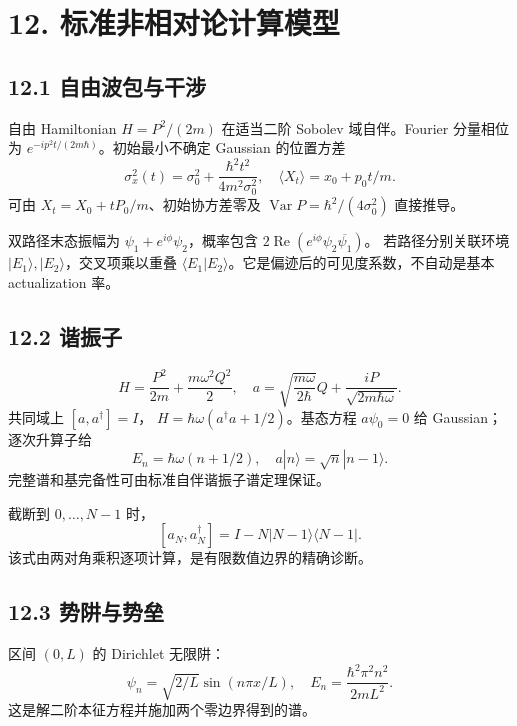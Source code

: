 \documentclass[
  11pt,
  oneside]{book}
\begin{document}
\hypertarget{ch-12}{%
\chapter{12. 标准非相对论计算模型}\label{ch-12}}

\hypertarget{ux81eaux7531ux6ce2ux5305ux4e0eux5e72ux6d89}{%
\section{12.1
自由波包与干涉}\label{ux81eaux7531ux6ce2ux5305ux4e0eux5e72ux6d89}}

自由 Hamiltonian \(H=P^2/(2m)\) 在适当二阶 Sobolev 域自伴。Fourier
分量相位为 \(e^{-ip^2t/(2m\hbar)}\)。初始最小不确定 Gaussian 的位置方差
\[
\sigma_x^2(t)=\sigma_0^2+\frac{\hbar^2t^2}{4m^2\sigma_0^2},
\quad \langle X_t\rangle=x_0+p_0t/m.
\] 可由 \(X_t=X_0+tP_0/m\)、初始协方差零及
\(\operatorname{Var}P=\hbar^2/(4\sigma_0^2)\) 直接推导。

双路径末态振幅为 \(\psi_1+e^{i\phi}\psi_2\)，概率包含
\(2\operatorname{Re}(e^{i\phi}\psi_2\overline{\psi_1})\)。
若路径分别关联环境 \(|E_1\rangle,|E_2\rangle\)，交叉项乘以重叠
\(\langle E_1|E_2\rangle\)。它是偏迹后的可见度系数，不自动是基本
actualization 率。

\hypertarget{ux8c10ux632fux5b50}{%
\section{12.2 谐振子}\label{ux8c10ux632fux5b50}}

\[
H=\frac{P^2}{2m}+\frac{m\omega^2Q^2}{2},\quad
a=\sqrt{\frac{m\omega}{2\hbar}}Q+\frac{iP}{\sqrt{2m\hbar\omega}}.
\] 共同域上 \([a,a^\dagger]=I\)，
\(H=\hbar\omega(a^\dagger a+1/2)\)。基态方程 \(a\psi_0=0\) 给
Gaussian；逐次升算子给 \[
E_n=\hbar\omega(n+1/2),\quad
a|n\rangle=\sqrt n|n-1\rangle.
\] 完整谱和基完备性可由标准自伴谐振子谱定理保证。

截断到 \(0,\ldots,N-1\) 时， \[
[a_N,a_N^\dagger]=I-N|N-1\rangle\langle N-1|.
\] 该式由两对角乘积逐项计算，是有限数值边界的精确诊断。

\hypertarget{ux52bfux9631ux4e0eux52bfux5792}{%
\section{12.3 势阱与势垒}\label{ux52bfux9631ux4e0eux52bfux5792}}

区间 \((0,L)\) 的 Dirichlet 无限阱： \[
\psi_n=\sqrt{2/L}\sin(n\pi x/L),\quad
E_n=\frac{\hbar^2\pi^2n^2}{2mL^2}.
\] 这是解二阶本征方程并施加两个零边界得到的谱。
\end{document}
